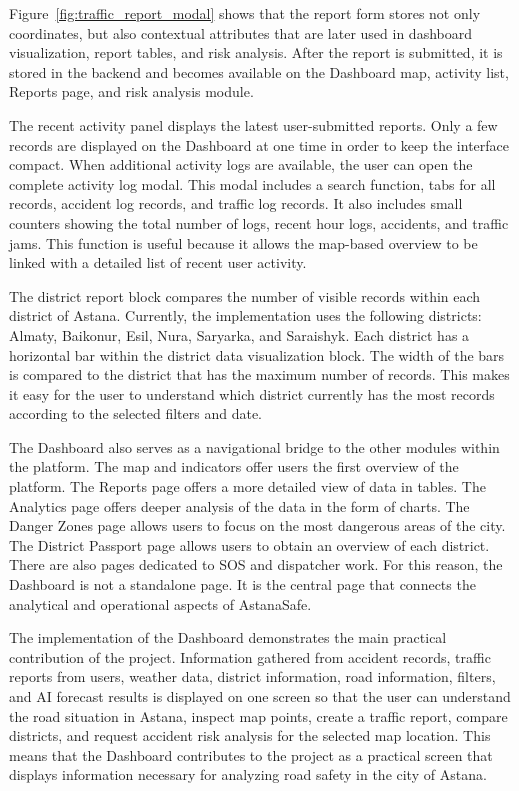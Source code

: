 ﻿\documentclass[12pt,a4paper]{report}
\begin{document}
Figure~\ref{fig:traffic_report_modal} shows that the report form stores not only coordinates, but also contextual attributes that are later used in dashboard visualization, report tables, and risk analysis. After the report is submitted, it is stored in the backend and becomes available on the Dashboard map, activity list, Reports page, and risk analysis module.

The recent activity panel displays the latest user-submitted reports. Only a few records are displayed on the Dashboard at one time in order to keep the interface compact. When additional activity logs are available, the user can open the complete activity log modal. This modal includes a search function, tabs for all records, accident log records, and traffic log records. It also includes small counters showing the total number of logs, recent hour logs, accidents, and traffic jams. This function is useful because it allows the map-based overview to be linked with a detailed list of recent user activity.

The district report block compares the number of visible records within each district of Astana. Currently, the implementation uses the following districts: Almaty, Baikonur, Esil, Nura, Saryarka, and Saraishyk. Each district has a horizontal bar within the district data visualization block. The width of the bars is compared to the district that has the maximum number of records. This makes it easy for the user to understand which district currently has the most records according to the selected filters and date.

The Dashboard also serves as a navigational bridge to the other modules within the platform. The map and indicators offer users the first overview of the platform. The Reports page offers a more detailed view of data in tables. The Analytics page offers deeper analysis of the data in the form of charts. The Danger Zones page allows users to focus on the most dangerous areas of the city. The District Passport page allows users to obtain an overview of each district. There are also pages dedicated to SOS and dispatcher work. For this reason, the Dashboard is not a standalone page. It is the central page that connects the analytical and operational aspects of AstanaSafe.

The implementation of the Dashboard demonstrates the main practical contribution of the project. Information gathered from accident records, traffic reports from users, weather data, district information, road information, filters, and AI forecast results is displayed on one screen so that the user can understand the road situation in Astana, inspect map points, create a traffic report, compare districts, and request accident risk analysis for the selected map location. This means that the Dashboard contributes to the project as a practical screen that displays information necessary for analyzing road safety in the city of Astana.
\end{document}
